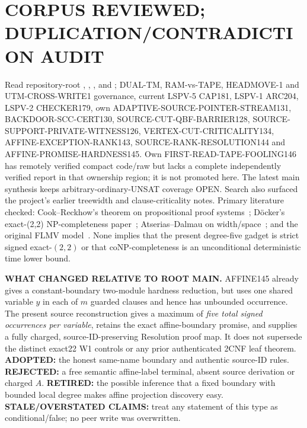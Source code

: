 \documentclass[11pt]{article}
\begin{document}
\section{CORPUS REVIEWED; DUPLICATION/CONTRADICTION AUDIT}
Read repository-root , , , and ; DUAL-TM, RAM-vs-TAPE, HEADMOVE-1 and UTM-CROSS-WRITE1 governance, current LSPV-5 CAP181, LSPV-1 ARC204, LSPV-2 CHECKER179, own ADAPTIVE-SOURCE-POINTER-STREAM131, BACKDOOR-SCC-CERT130, SOURCE-CUT-QBF-BARRIER128, SOURCE-SUPPORT-PRIVATE-WITNESS126, VERTEX-CUT-CRITICALITY134, AFFINE-EXCEPTION-RANK143, SOURCE-RANK-RESOLUTION144 and AFFINE-PROMISE-HARDNESS145. Own FIRST-READ-TAPE-FOOLING146 has remotely verified compact code/raw but lacks a complete independently verified report in that ownership region; it is not promoted here. The latest main synthesis keeps arbitrary-ordinary-UNSAT coverage OPEN. Search also surfaced the project's earlier treewidth and clause-criticality notes. Primary literature checked: Cook--Reckhow's theorem on propositional proof systems~\cite{CR}; D\"ocker's exact-(2,2) NP-completeness paper~\cite{Doc}; Atserias--Dalmau on width/space~\cite{AD}; and the original FLMV model~\cite{FLMV}. None implies that the present degree-five gadget is strict signed exact-$(2,2)$ or that coNP-completeness is an unconditional deterministic time lower bound.

\noindent\textbf{WHAT CHANGED RELATIVE TO ROOT MAIN.} AFFINE145 already gives a constant-boundary two-module hardness reduction, but uses one shared variable $y$ in each of $m$ guarded clauses and hence has unbounded occurrence. The present source reconstruction gives a maximum of \emph{five total signed occurrences per variable}, retains the exact affine-boundary promise, and supplies a fully charged, source-ID-preserving Resolution proof map. It does not supersede the distinct exact22 W1 controls or any prior authenticated 2CNF leaf theorem. \textbf{ADOPTED:} the honest same-name boundary and authentic source-ID rules. \textbf{REJECTED:} a free semantic affine-label terminal, absent source derivation or charged $A$. \textbf{RETIRED:} the possible inference that a fixed boundary with bounded local degree makes affine projection discovery easy. \textbf{STALE/OVERSTATED CLAIMS:} treat any statement of this type as conditional/false; no peer write was overwritten.
\end{document}
